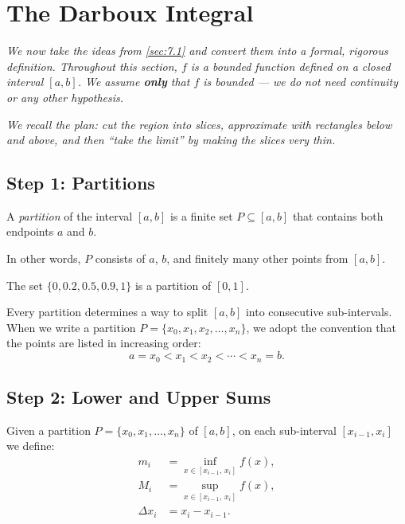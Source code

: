 \section{The Darboux Integral}
\label{sec:7.5}

\textit{We now take the ideas from \cref{sec:7.1} and convert them into a formal, rigorous definition.  Throughout this section, $f$ is a bounded function defined on a closed interval $[a,b]$.  We assume \textbf{only} that $f$ is bounded --- we do not need continuity or any other hypothesis.}

\textit{We recall the plan: cut the region into slices, approximate with rectangles below and above, and then ``take the limit'' by making the slices very thin.}

\subsection*{Step 1: Partitions}

\begin{definition}[Partition]
\label{def:7-8}
A \emph{partition} of the interval $[a,b]$ is a finite set $P \subseteq [a,b]$ that contains both endpoints $a$ and $b$.
\end{definition}

In other words, $P$ consists of $a$, $b$, and finitely many other points from $[a,b]$.

\begin{example}
\label{ex:7-8}
The set $\{0, 0.2, 0.5, 0.9, 1\}$ is a partition of $[0,1]$.
\end{example}

Every partition determines a way to split $[a,b]$ into consecutive sub-intervals.  When we write a partition $P = \{x_0, x_1, x_2, \ldots, x_n\}$, we adopt the convention that the points are listed in increasing order:
\[
  a = x_0 < x_1 < x_2 < \cdots < x_n = b.
\]

\subsection*{Step 2: Lower and Upper Sums}

Given a partition $P = \{x_0, x_1, \ldots, x_n\}$ of $[a,b]$, on each sub-interval $[x_{i-1}, x_i]$ we define:
\begin{align*}
  m_i &= \inf_{x \in [x_{i-1},\, x_i]} f(x), \\[4pt]
  M_i &= \sup_{x \in [x_{i-1},\, x_i]} f(x), \\[4pt]
  \Delta x_i &= x_i - x_{i-1}.
\end{align*}

